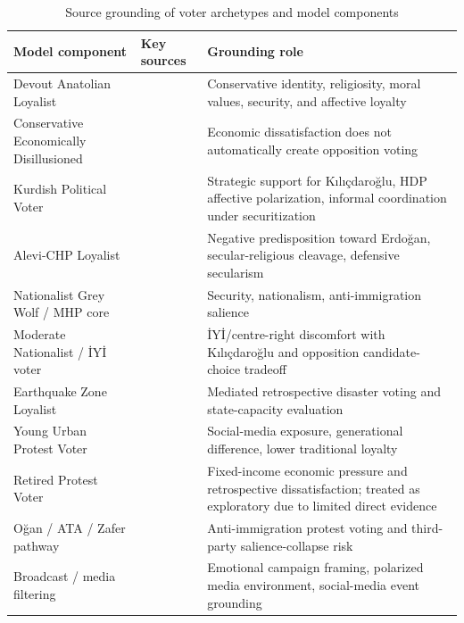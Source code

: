 \documentclass[pdflatex,sn-mathphys-num,iicol]{sn-jnl}
\begin{document}
\begin{table}[t]
\caption{Source grounding of voter archetypes and model components}
\label{tab:source_grounding}
\centering
\footnotesize
\begin{tabular}{@{}p{}p{}p{}@{}}
\toprule
Model component & Key sources & Grounding role \\
\midrule
Devout Anatolian Loyalist & \cite{carkoglu2024unlikely,aytac2025polarised} & Conservative identity, religiosity, moral values, security, and affective loyalty \\
Conservative Economically Disillusioned & \cite{carkoglu2024unlikely,yildirim2025sege,cinkara2025erdogan} & Economic dissatisfaction does not automatically create opposition voting \\
Kurdish Political Voter & \cite{baruh2024difficult,aytac2025polarised,ilbiz2023securitization,yegen2022kurdish,ysp2023manifesto} & Strategic support for Kılıçdaroğlu, HDP affective polarization, informal coordination under securitization \\
Alevi-CHP Loyalist & \cite{carkoglu2024unlikely,kuru2017religious,ozbudun2013cleavages} & Negative predisposition toward Erdoğan, secular-religious cleavage, defensive secularism \\
Nationalist Grey Wolf / MHP core & \cite{carkoglu2024unlikely,gerim2025victory,karaca2024socialmedia} & Security, nationalism, anti-immigration salience \\
Moderate Nationalist / İYİ voter & \cite{baruh2024difficult,demir2024iyi} & İYİ/centre-right discomfort with Kılıçdaroğlu and opposition candidate-choice tradeoff \\
Earthquake Zone Loyalist & \cite{sevinc2024afet,carkoglu2024unlikely} & Mediated retrospective disaster voting and state-capacity evaluation \\
Young Urban Protest Voter & \cite{hafizoglu2021z,karaca2024socialmedia,aytac2025polarised} & Social-media exposure, generational difference, lower traditional loyalty \\
Retired Protest Voter & \cite{carkoglu2024unlikely,yildirim2025sege} & Fixed-income economic pressure and retrospective dissatisfaction; treated as exploratory due to limited direct evidence \\
Oğan / ATA / Zafer pathway & \cite{gerim2025victory,karaca2024socialmedia,kang2026dynamok} & Anti-immigration protest voting and third-party salience-collapse risk \\
Broadcast / media filtering & \cite{zeynel2024duygular,bozdag2022skeptical,najafi2024dataset} & Emotional campaign framing, polarized media environment, social-media event grounding \\

\end{tabular}
\end{table}
\end{document}
